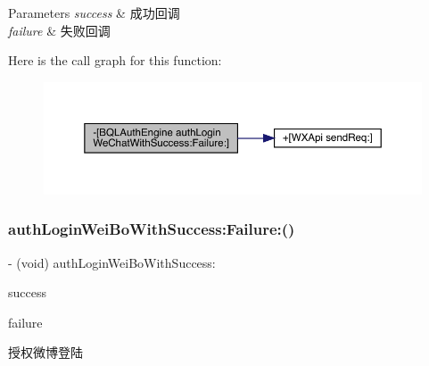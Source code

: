 \begin{DoxyParams}{Parameters}
{\em success} & 成功回调 \\
\hline
{\em failure} & 失败回调 \\
\hline
\end{DoxyParams}
Here is the call graph for this function\+:\nopagebreak
\begin{figure}[H]
\begin{center}
\leavevmode
\includegraphics[width=350pt]{interface_b_q_l_auth_engine_a48b93722b4fdedf032b34edc95643790_cgraph}
\end{center}
\end{figure}
\mbox{\label{interface_b_q_l_auth_engine_ae9a00b2bcc82ed659282621120821eda}} 
\subsubsection{\texorpdfstring{auth\+Login\+Wei\+Bo\+With\+Success\+:\+Failure\+:()}{authLoginWeiBoWithSuccess:Failure:()}}
{\footnotesize\ttfamily -\/ (void) auth\+Login\+Wei\+Bo\+With\+Success\+: \begin{DoxyParamCaption}\item[{(B\+Q\+L\+Auth\+Success\+Block)}]{success }\item[{Failure:(B\+Q\+L\+Auth\+Failure\+Block)}]{failure }\end{DoxyParamCaption}}

授权微博登陆


